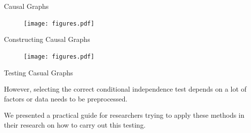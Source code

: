 \documentclass[aspectratio=169]{beamer}
\begin{document}
\begin{frame}{Causal Graphs}
	\vspace{1em}

	\begin{figure}
		\texttt{[image: figures.pdf]}
	\end{figure}

	\vspace{1em}
\end{frame}

% 
% 
% 

\begin{frame}{Constructing Causal Graphs}

\begin{figure}
	\texttt{[image: figures.pdf]}
\end{figure}

	
\end{frame}

\begin{frame}{Testing Casual Graphs}

	However, selecting the correct conditional independence test depends on a lot of factors or data needs to be preprocessed.

	We presented a practical guide for researchers trying to apply these methods in their research on how to carry out this testing.
\end{frame}
\end{document}
